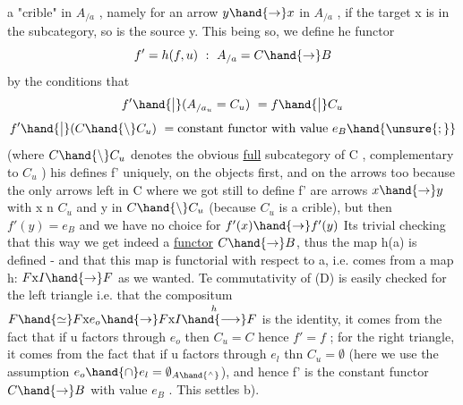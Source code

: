 
a "crible"\inserted{[or ``sieve'']} in $A_{/a}$ , namely for an arrow $y\hand{\to} x$ in $A_{/a}$ , if the target x is
in the subcategory, so is the source y. This being so, we define he
functor
\[ f' = h(f,u) \ : \ A_{/a}=C \hand{\to} B \]
by the conditions that
\[ f'\hand{\big|}(A_{/a_u} = C_u) \ = f\hand{\big|}C_u \]
\[ f'\hand{\big|}(C\hand{\setminus} C_u) \ = \text{constant functor with value } e_B\hand{\unsure{;}} \]
(where $C\hand{\setminus} C_u$ denotes the obvious \uline{full} subcategory of C , complementary to
$C_u$ ) his defines f' uniquely,  on the objects first, and on the
arrows too because the only arrows left  in C where we got still to
define f' are arrows $x \hand{\to} y$ with x n $C_u$ and y in $C\hand{\setminus} C_u$ (because $C_u$ is a
crible), but then $f'(y) = e_B$ and we have no choice for $f'(x)\hand{\to} f'(y)$\hand{!}
Its trivial checking that this way we get indeed a \uline{functor} $C\hand{\to} B$, thus
the map h(a) is defined - and that this map is functorial with respect to
a, i.e. comes from a map h: $F\mathrm{x} I \hand{\to} F$ as we wanted. Te commutativity
of (D) is easily checked\over{\unsure{,}}{:} for the left triangle i.e. that the compositum
$F \hand{\simeq} F\mathrm{x} e_o \hand{\to} F\mathrm{x} I \overset{h}{\hand{\longrightarrow}} F$ is the identity, it comes from the fact that if u
factors through $e_o$ then $C_u = C$ hence $f' = f$ ; for the right triangle, it
comes from the fact that if u factors through $e_l$ thn $C_u = \emptyset$ (here we use
the assumption $e_o\hand{\cap}e_l = \emptyset_{A\hand{^\wedge}}$), and hence f' is the constant functor $C\hand{\to} B$
with value $e_B$ . This settles b).

